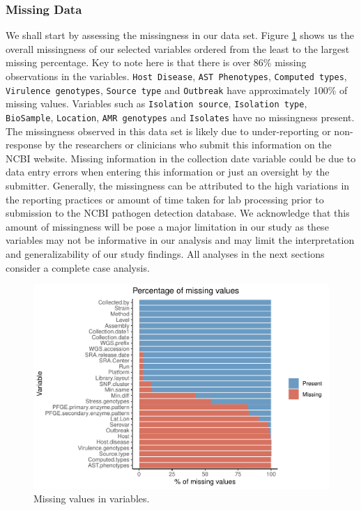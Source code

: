 \documentclass[
  10pt,
]{article}
\begin{document}
\hypertarget{missing-data}{%
\subsubsection{Missing Data}\label{missing-data}}

We shall start by assessing the missingness in our data set. Figure \ref{fig:fig-two} shows us the overall missingness of our selected variables ordered from the least to the largest missing percentage. Key to note here is that there is over 86\% missing observations in the variables. \texttt{Host\ Disease}, \texttt{AST\ Phenotypes}, \texttt{Computed\ types}, \texttt{Virulence\ genotypes}, \texttt{Source\ type} and \texttt{Outbreak} have approximately 100\% of missing values. Variables such as \texttt{Isolation\ source}, \texttt{Isolation\ type}, \texttt{BioSample}, \texttt{Location}, \texttt{AMR\ genotypes} and \texttt{Isolates} have no missingness present. The missingness observed in this data set is likely due to under-reporting or non-response by the researchers or clinicians who submit this information on the NCBI website. Missing information in the collection date variable could be due to data entry errors when entering this information or just an oversight by the submitter. Generally, the missingness can be attributed to the high variations in the reporting practices or amount of time taken for lab processing prior to submission to the NCBI pathogen detection database. We acknowledge that this amount of missingness will be pose a major limitation in our study as these variables may not be informative in our analysis and may limit the interpretation and generalizability of our study findings. All analyses in the next sections consider a complete case analysis.

\begin{figure}[H]

{\centering \includegraphics{php2550_final_manuscript_files/figure-latex/fig-two-1} 

}

\caption{Missing values in variables.}\label{fig:fig-two}
\end{figure}
\end{document}
